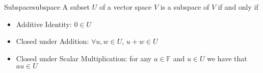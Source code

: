 \begin{definition}{Subspace}{subspace}
A subset \( U \) of a vector space \( V \) is a subspace of \( V \) if and only if 
\begin{itemize}
    \item Additive Identity: \( 0 \in  U \) 
    \item Closed under Addition: \( \forall u, w \in U \), \( u +  w \in  U \) 
    \item Closed under Scalar Multiplication: for any \( a \in \mathbb{F} \) and
    \( u \in  U \) we have that \( au \in  U  \) 
\end{itemize}
\end{definition}
